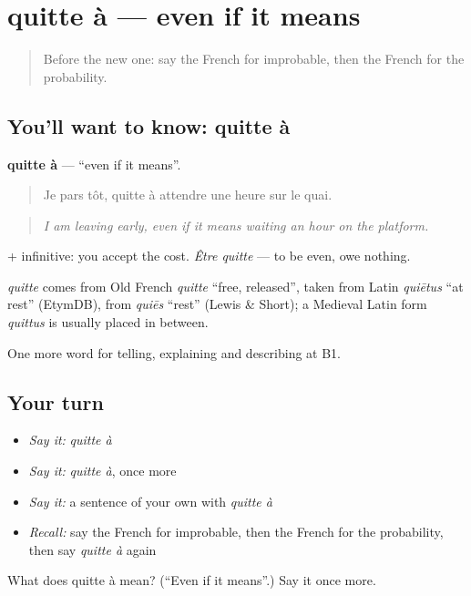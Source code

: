 \section[quitte à]{quitte à — even if it means}

\label{lesson:FR-C372-quitte-a}



\begin{quote}
Before the new one: say the French for improbable, then the French for the probability.
\end{quote}

\subsection*{You'll want to know: quitte à}
\textbf{quitte à} — \textquotedblleft{}even if it means\textquotedblright{}.

\begin{quote}
Je pars tôt, quitte à attendre une heure sur le quai.
\end{quote}

\begin{quote}
\emph{I am leaving early, even if it means waiting an hour on the platform.}
\end{quote}

+ infinitive: you accept the cost. \emph{Être quitte} — to be even, owe nothing.

\begin{cousinweb}
\emph{quitte} comes from Old French \emph{quitte} \textquotedblleft{}free, released\textquotedblright{}, taken from Latin \emph{quiētus} \textquotedblleft{}at rest\textquotedblright{} (EtymDB), from \emph{quiēs} \textquotedblleft{}rest\textquotedblright{} (Lewis \& Short); a Medieval Latin form \emph{quittus} is usually placed in between.
\end{cousinweb}

\begin{grammarlens}[title={What you've built}]
One more word for telling, explaining and describing at B1.
\end{grammarlens}

\subsection*{Your turn}
\begin{itemize}
\raggedright
  \item \emph{Say it:} \emph{quitte à}
  \item \emph{Say it:} \emph{quitte à}, once more
  \item \emph{Say it:} a sentence of your own with \emph{quitte à}
  \item \emph{Recall:} say the French for improbable, then the French for the probability, then say \emph{quitte à} again
\end{itemize}

\begin{tcolorbox}[breakable,colback=teal!4,colframe=teal!35!black,title={Before you move on}]
What does quitte à mean? (\textquotedblleft{}Even if it means\textquotedblright{}.) Say it once more.
\end{tcolorbox}
